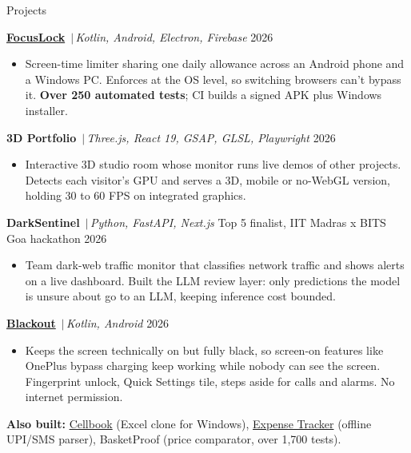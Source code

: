 \documentclass{resume}
\newcommand{\sep}{\,$|$\,}
\begin{document}
\begin{rSection}{Projects}

\textbf{\href{https://github.com/dhruv4740/focuslock}{FocusLock}} \sep \textit{Kotlin, Android, Electron, Firebase} \hfill {\small 2026}
\begin{itemize}
  \itemsep -2pt
  \item Screen-time limiter sharing one daily allowance across an Android phone and a Windows PC. Enforces at the OS level, so switching browsers can't bypass it. \textbf{Over 250 automated tests}; CI builds a signed APK plus Windows installer.
\end{itemize}

\vspace{1mm}
\textbf{3D Portfolio} \sep \textit{Three.js, React 19, GSAP, GLSL, Playwright} \hfill {\small 2026}
\begin{itemize}
  \itemsep -2pt
  \item Interactive 3D studio room whose monitor runs live demos of other projects. Detects each visitor's GPU and serves a 3D, mobile or no-WebGL version, holding 30 to 60 FPS on integrated graphics.
\end{itemize}

\vspace{1mm}
\textbf{DarkSentinel} \sep \textit{Python, FastAPI, Next.js} \hfill {\small Top 5 finalist, IIT Madras x BITS Goa hackathon 2026}
\begin{itemize}
  \itemsep -2pt
  \item Team dark-web traffic monitor that classifies network traffic and shows alerts on a live dashboard. Built the LLM review layer: only predictions the model is unsure about go to an LLM, keeping inference cost bounded.
\end{itemize}

\vspace{1mm}
\textbf{\href{https://github.com/dhruv4740/blackout}{Blackout}} \sep \textit{Kotlin, Android} \hfill {\small 2026}
\begin{itemize}
  \itemsep -2pt
  \item Keeps the screen technically on but fully black, so screen-on features like OnePlus bypass charging keep working while nobody can see the screen. Fingerprint unlock, Quick Settings tile, steps aside for calls and alarms. No internet permission.
\end{itemize}

\vspace{1mm}
\textbf{Also built:} \href{https://github.com/dhruv4740/cellbook}{Cellbook} (Excel clone for Windows), \href{https://github.com/dhruv4740/expense-tracker}{Expense Tracker} (offline UPI/SMS parser), BasketProof (price comparator, over 1,700 tests).

\end{rSection}
\end{document}
